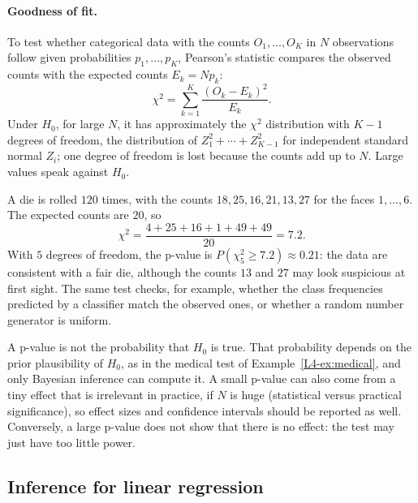 \paragraph{Goodness of fit.} To test whether categorical data with the counts $O_1, \ldots, O_K$ in $N$ observations follow given probabilities $p_1, \ldots, p_K$, Pearson's statistic compares the observed counts with the expected counts $E_k = Np_k$:
\[\chi^2 = \sum_{k=1}^K \frac{(O_k - E_k)^2}{E_k}.\]
Under $H_0$, for large $N$, it has approximately the $\chi^2$ distribution with $K - 1$ degrees of freedom, the distribution of $Z_1^2 + \cdots + Z_{K-1}^2$ for independent standard normal $Z_i$; one degree of freedom is lost because the counts add up to $N$. Large values speak against $H_0$.

\begin{example}\label{L4-ex:chi-square}
    A die is rolled $120$ times, with the counts $18, 25, 16, 21, 13, 27$ for the faces $1, \ldots, 6$. The expected counts are $20$, so
    \[\chi^2 = \frac{4 + 25 + 16 + 1 + 49 + 49}{20} = 7.2.\]
    With $5$ degrees of freedom, the p-value is $P(\chi^2_5 \geq 7.2) \approx 0.21$: the data are consistent with a fair die, although the counts $13$ and $27$ may look suspicious at first sight. The same test checks, for example, whether the class frequencies predicted by a classifier match the observed ones, or whether a random number generator is uniform.
\end{example}

\begin{remark}
    A p-value is not the probability that $H_0$ is true. That probability depends on the prior plausibility of $H_0$, as in the medical test of Example~\ref{L4-ex:medical}, and only Bayesian inference can compute it. A small p-value can also come from a tiny effect that is irrelevant in practice, if $N$ is huge (statistical versus practical significance), so effect sizes and confidence intervals should be reported as well. Conversely, a large p-value does not show that there is no effect: the test may just have too little power.
\end{remark}

\subsection{Inference for linear regression}\label{L4-sec:regression-inference}


